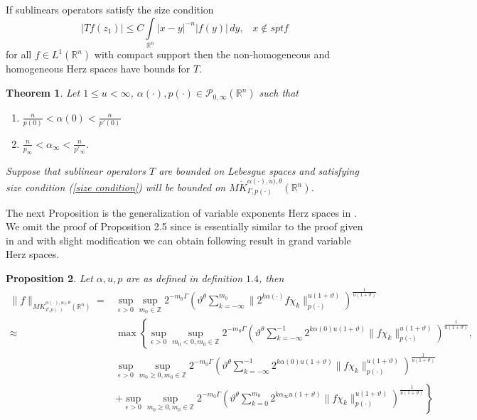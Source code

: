 \documentclass[oneside,reqno]{amsart}
\newtheorem{theorem}{Theorem}[section]
\newtheorem{prop}[theorem]{Proposition}
\numberwithin{equation}{section}
\theoremstyle{definition}
\begin{document}
If sublinears operators satisfy the size condition
\begin{equation}\label{size condition}
|T
f(z_1) |\leq C \int \limits _{\mathbb{R}^n} |x-y|^{-n}|f(y)|\,d y, \;\;\; x \notin spt f
\end{equation}
for all $f \in L^1(\mathbb{R}^n)$ with compact support then the non-homogeneous and homogeneous Herz spaces have bounds for $T$.  
\begin{theorem}\cite{ghm5}
	Let $  1 \leq u < \infty$, $\alpha(\cdot), p(\cdot) \in \mathcal{P}_{0,\infty}(\mathbb{R}^n) $ such that
	\begin{enumerate}
		\item [(i)] $ \frac{n}{p(0)}< \alpha(0) <    \frac{n}{p'(0)}$
		\item [(ii)] $\frac{n}{p_{\infty}} < \alpha_\infty < \frac{n}{p'_{\infty} }$.
	\end{enumerate}
	 Suppose that  sublinear operators $T$  are bounded on  Lebesgue spaces and satisfying size condition (\ref{size condition}) will be bounded on $M\dot{K} ^{\alpha(\cdot),u),\theta}_{ \Gamma, p(\cdot)}(\mathbb{R}^n)$.
\end{theorem}

The next Proposition is the generalization of variable exponents Herz spaces in \cite{cald15}. We omit the proof of Proposition 2.5 since is essentially similar to the proof given in \cite{cald15} and with slight modification we can obtain following result in grand variable Herz spaces. 
\begin{prop}
	Let $\alpha, u, p$ are as defined in definition $1.4$, then 
	\begin{align*}
	\| f \|_{M\dot{K} ^{\alpha(\cdot),u),\theta}_{ \Gamma, p(\cdot)}(\mathbb{R}^n)}= &  \sup \limits_{\epsilon   >0} \sup \limits _{ m_0 \in \mathbb{Z}} 2^{-m_0\Gamma  } \left( \vartheta   ^\theta \sum_{k =-\infty }^{m_0} \|2^{k \alpha(\cdot) }f \chi _k  \|  ^{u(1+\vartheta)}_{{p(\cdot)}}\right)^{\frac{1}{u(1+\vartheta)}} \\
 \approx & \max \left\{ \sup \limits_{\epsilon   >0} \sup \limits _{ m_0< 0, m_0 \in \mathbb{Z}} 2^{-m_0\Gamma } \left( \vartheta   ^\theta \sum_{k =-\infty }^{-1}2^{k \alpha(0) u(1+\vartheta)} \|f \chi _k  \|  ^{u(1+\vartheta)}_{{p(\cdot)}}\right)^{\frac{1}{u(1+\vartheta)}},\right.\\
	& \left. \sup \limits_{\epsilon   >0} \sup \limits _{ m_0\geq 0, m_0\in  \mathbb{Z}} 2^{-m_0\Gamma } \left( \vartheta   ^\theta \sum_{k =-\infty }^{-1}2^{k \alpha(0) u(1+\vartheta)} \|f \chi _k  \|  ^{u(1+\vartheta)}_{{p(\cdot)}}\right)^{\frac{1}{u(1+\vartheta)}} \right.\\
 & \left. + \sup \limits_{\epsilon   >0} \sup \limits _{ m_0\geq 0, m_0\in  \mathbb{Z}} 2^{-m_0\Gamma } \left( \vartheta   ^\theta \sum_{k =0 }^{m_0}2^{k \alpha_\infty u(1+\vartheta)} \|f \chi _k  \|  ^{u(1+\vartheta)}_{{p(\cdot)}}\right)^{\frac{1}{u(1+\vartheta)}} \right\}
	\end{align*}
\end{prop}
\end{document}

